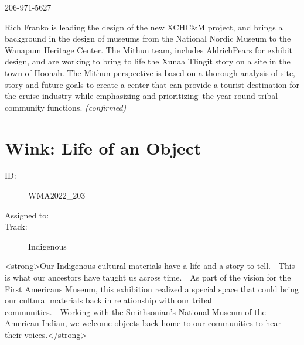 \documentclass{report}
\begin{document}
                206-971-5627\newline

                Rich Franko is leading the design of the new XCHC\&M project, and brings a background in the design of museums from the National Nordic Museum to the Wanapum Heritage Center. The Mithun team, includes AldrichPears for exhibit design, and are working to bring to life the Xunaa Tlingit story on a site in the town of Hoonah. The Mithun perspective is based on a thorough analysis of site, story and future goals to create a center that can provide a tourist destination for the cruise industry while emphasizing and prioritizing the year round tribal community functions.
                \emph{ (confirmed) }
              

              
        
          \newpage
          \section{ Wink:  Life of an Object }
            \begin{description}
              \item [ID:]
              WMA2022\_203

              \item [Assigned to:]
                \item [Track:]Indigenous~
              \end{description}

              <strong>Our Indigenous cultural materials have a life and a story to tell.  This is what our ancestors have taught us across time.  As part of the vision for the First Americans Museum, this exhibition realized a special space that could bring our cultural materials back in relationship with our tribal communities.  Working with the Smithsonian’s National Museum of the American Indian, we welcome objects back home to our communities to hear their voices.</strong>
\end{document}

